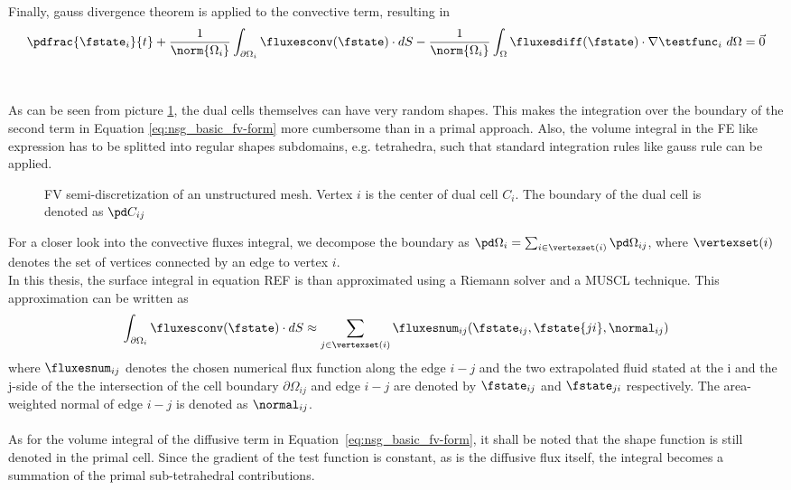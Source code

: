 \documentclass[../main.tex]{subfiles}
\begin{document}
Finally, gauss divergence theorem is applied to the convective term, resulting in
\begin{align}\label{eq:nsg_basic_fv-form}
\pdfrac{\fstate_i}{t} +
\frac{1}{\norm{\Omega_i}} \int_{\partial\Omega_i} \fluxesconv(\fstate)\cdot dS -
\frac{1}{\norm{\Omega_i}} \int_\Omega \fluxesdiff(\fstate)\cdot\nabla\testfunc_i ~d\Omega  =
\vec{0}
\end{align}
 \\
 \\
As can be seen from picture \ref{fig:dualcell_unstructured}, the dual cells themselves can have very random shapes. This makes the integration over the boundary of the second term in Equation \eqref{eq:nsg_basic_fv-form} more cumbersome than in a primal approach. Also, the volume integral in the \ac{FE} like expression has to be splitted into regular shapes subdomains, e.g. tetrahedra, such that standard integration rules like gauss rule can be applied.




\begin{figure}[h]
\centering

\caption{\ac{FV} semi-discretization of an unstructured mesh. Vertex $i$ is the center of dual cell $C_i$. The boundary of the dual cell is denoted as $\pd C_{ij}$}
\label{fig:dualcell_unstructured}
\end{figure}


For a closer look into the convective fluxes integral, we decompose the boundary as $\pd \Omega_i = \sum_{i \in \vertexset(i)} \pd\Omega_{ij}$, where $\vertexset(i)$ denotes the set of vertices connected by an edge to vertex $i$.\\
In this thesis, the surface integral in equation REF is than approximated using a Riemann solver and a \ac{MUSCL} \cite{VanLeer1979} technique. This approximation can be written as
\begin{align}
\int_{\partial\Omega_i} \fluxesconv(\fstate)\cdot dS \approx
\sum_{j \in \vertexset(i)} \fluxesnum_{ij}(\fstate_{ij},\fstate{ji},\normal_{ij})
\end{align}
where $\fluxesnum_{ij}$ denotes the chosen numerical flux function along the edge $i-j$ and the two extrapolated fluid stated at the i and the j-side of the the intersection of the cell boundary $\partial \Omega_{ij}$ and edge $i-j$ are denoted by $\fstate_{ij}$ and $\fstate_{ji}$ respectively. The area-weighted normal of edge $i-j$ is denoted as $\normal_{ij}$.
 \\
 \\
As for the volume integral of the diffusive term in Equation~\eqref{eq:nsg_basic_fv-form}, it shall be noted that the shape function is still denoted in the primal cell. Since the gradient of the test function is constant, as is the diffusive flux itself, the integral becomes a summation of the primal sub-tetrahedral contributions.
\end{document}
